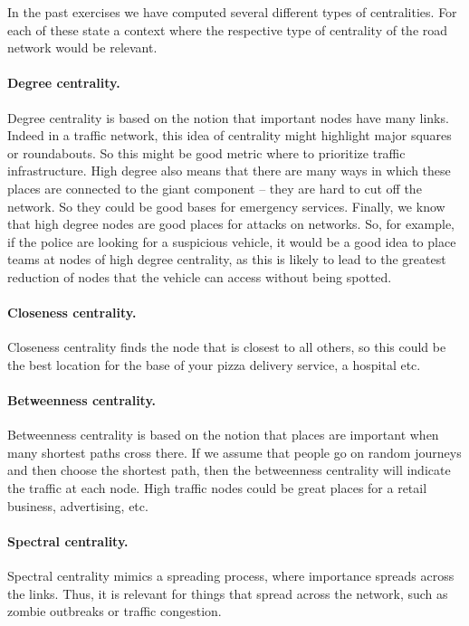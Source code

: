 In the past exercises we have computed several different types of centralities. For each of these state a context where the respective type of centrality of the road network would be relevant. 

\solution
\paragraph{Degree centrality.}Degree centrality is based on the notion that important nodes have many links. Indeed in a traffic network, this idea of centrality might highlight major squares or roundabouts. So this might be good metric where to prioritize traffic infrastructure. High degree also means that there are many ways in which these places are connected to the giant component -- they are hard to cut off the network. So they could be good bases for emergency services. Finally, we know that high degree nodes are good places for attacks on networks. So, for example, if the police are looking for a suspicious vehicle, it would be a good idea to place teams at nodes of high degree centrality, as this is likely to lead to the greatest reduction of nodes that the vehicle can access without being spotted.  

\paragraph{Closeness centrality.}Closeness centrality finds the node that is closest to all others, so this could be the best location for the base of your pizza delivery service, a hospital etc.  

\paragraph{Betweenness centrality.}Betweenness centrality is based on the notion that places are important when many shortest paths cross there. If we assume that people go on random journeys and then choose the shortest path, then the betweenness centrality will indicate the traffic at each node. High traffic nodes could be great places for a retail business, advertising, etc.   

\paragraph{Spectral centrality.}Spectral centrality mimics a spreading process, where importance spreads across the links. Thus, it is relevant for things that spread across the network, such as zombie outbreaks or traffic congestion. 

